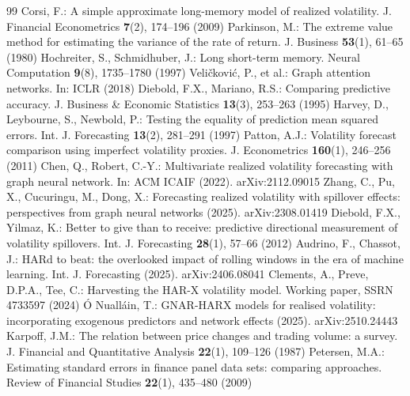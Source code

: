 \documentclass{llncs}
\begin{document}
\begin{thebibliography}{99}
 Corsi, F.: A simple approximate long-memory model of realized volatility. J. Financial Econometrics \textbf{7}(2), 174--196 (2009)
 Parkinson, M.: The extreme value method for estimating the variance of the rate of return. J. Business \textbf{53}(1), 61--65 (1980)
 Hochreiter, S., Schmidhuber, J.: Long short-term memory. Neural Computation \textbf{9}(8), 1735--1780 (1997)
 Veli\v{c}kovi\'c, P., et al.: Graph attention networks. In: ICLR (2018)
 Diebold, F.X., Mariano, R.S.: Comparing predictive accuracy. J. Business \& Economic Statistics \textbf{13}(3), 253--263 (1995)
 Harvey, D., Leybourne, S., Newbold, P.: Testing the equality of prediction mean squared errors. Int. J. Forecasting \textbf{13}(2), 281--291 (1997)
 Patton, A.J.: Volatility forecast comparison using imperfect volatility proxies. J. Econometrics \textbf{160}(1), 246--256 (2011)
 Chen, Q., Robert, C.-Y.: Multivariate realized volatility forecasting with graph neural network. In: ACM ICAIF (2022). arXiv:2112.09015
 Zhang, C., Pu, X., Cucuringu, M., Dong, X.: Forecasting realized volatility with spillover effects: perspectives from graph neural networks (2025). arXiv:2308.01419
 Diebold, F.X., Yilmaz, K.: Better to give than to receive: predictive directional measurement of volatility spillovers. Int. J. Forecasting \textbf{28}(1), 57--66 (2012)
 Audrino, F., Chassot, J.: HARd to beat: the overlooked impact of rolling windows in the era of machine learning. Int. J. Forecasting (2025). arXiv:2406.08041
 Clements, A., Preve, D.P.A., Tee, C.: Harvesting the HAR-X volatility model. Working paper, SSRN 4733597 (2024)
 \'O Nuall\'ain, T.: GNAR-HARX models for realised volatility: incorporating exogenous predictors and network effects (2025). arXiv:2510.24443
 Karpoff, J.M.: The relation between price changes and trading volume: a survey. J. Financial and Quantitative Analysis \textbf{22}(1), 109--126 (1987)
 Petersen, M.A.: Estimating standard errors in finance panel data sets: comparing approaches. Review of Financial Studies \textbf{22}(1), 435--480 (2009)
\end{thebibliography}
\end{document}
